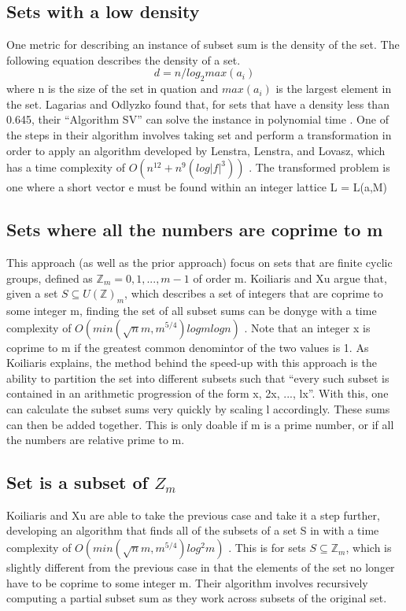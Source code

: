 \documentclass{report}
\begin{document}
\subsection{Sets with a low density}
One metric for describing an instance of subset sum is
the density of the set. The following equation
describes the density of a set.
$$d = n / log_2 max(a_i)$$
where n is the size of the set in quation and $max(a_i)$ is the largest
element in the set.
Lagarias and Odlyzko found that, for sets that have a density less than 0.645,
their ``Algorithm SV'' can solve the instance in polynomial
time \cite{lagarias1985}. One of the steps in their algorithm involves
taking set and perform a transformation in order to apply an
algorithm developed by Lenstra, Lenstra, and Lovasz, which has a time
complexity of $O(n^{12}+n^9(log|f|^3))$ \cite{lenstra1982}. The transformed
problem is one where a short vector e must be found within an integer lattice
L = L(a,M)

\subsection{Sets where all the numbers are coprime to m}
This approach (as well as the prior approach) focus on sets that are finite
cyclic groups, defined as $\mathbb{Z}_m = {0, 1, ..., m-1}$ of order m.
Koiliaris and Xu argue that, given a set $S \subseteq U(\mathbb{Z})_m$, which
describes a set of integers that are coprime to some integer m, finding
the set of all subset sums can be donyge with a time complexity of
$O(min(\sqrt{n}m,m^{5/4})log m log n)$ \cite{koiliaris2016}.
Note that an integer x is
coprime to m if the greatest common denomintor of the two values is 1.
As Koiliaris explains, the method behind the speed-up with this approach
is the ability to partition the set into different subsets such that ``every
such subset is contained in an arithmetic progression of the form
x, 2x, ..., lx''. With this, one can calculate the subset sums very quickly
by scaling l accordingly. These sums can then be added together. This is
only doable if m is a prime number, or if all the numbers are relative prime
to m.

\subsection{Set is a subset of $Z_m$}
Koiliaris and Xu are able to take the previous case and take it a step further,
developing an algorithm that finds all of the subsets of a set S in with a
time complexity of $O(min(\sqrt{n}m,m^{5/4})log^2m)$  \cite{koiliaris2016}.
This is for sets $S \subseteq \mathbb{Z}_m$, which is slightly different from
the previous case in that the elements of the set no longer have to be
coprime to some integer m.
Their algorithm involves recursively computing a partial subset sum
as they work across subsets of the original set.
\end{document}
